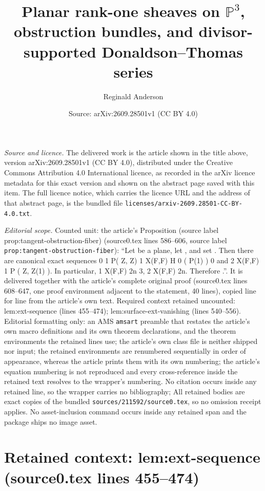 \documentclass[10pt,a4paper]{amsart}
\title[Planar rank-one sheaves on $\mathbb{P}^3$, obstruction bundles, and divisor-supported Donaldson--Thomas series]{Planar rank-one sheaves on $\mathbb{P}^3$, obstruction bundles, and divisor-supported Donaldson--Thomas series}
\author{Reginald Anderson}
\date{Source: arXiv:2609.28501v1 (CC BY 4.0)}
\theoremstyle{plain}
\theoremstyle{definition}
\theoremstyle{remark}
\begin{document}
\maketitle

\noindent\emph{Source and licence.} The delivered work is the article shown in the title above, version arXiv:2609.28501v1 (CC BY 4.0), distributed under the Creative Commons Attribution 4.0 International licence, as recorded in the arXiv licence metadata for this exact version and shown on the abstract page saved with this item. The full licence notice, which carries the licence URL and the address of that abstract page, is the bundled file \texttt{licenses/arxiv-2609.28501-CC-BY-4.0.txt}.
\par\smallskip

\noindent\textit{Editorial scope.} Counted unit: the article's Proposition (source label prop:tangent-obstruction-fiber) (source0.tex lines 586--606, source label \texttt{prop:tangent-obstruction-fiber}): ``Let be a plane, let , and set . Then there are canonical exact sequences 0 1 P( Z, Z) 1 X(F,F) H 0 ( P(1) ) 0 and 2 X(F,F) 1 P ( Z, Z(1) ). In particular, 1 X(F,F) 2n 3, 2 X(F,F) 2n. Therefore .''. It is delivered together with the article's complete original proof (source0.tex lines 608--647, one proof environment adjacent to the statement, 40 lines), copied line for line from the article's own text. Required context retained uncounted: lem:ext-sequence (lines 455--474); lem:surface-ext-vanishing (lines 540--556). Editorial formatting only: an AMS \texttt{amsart} preamble that restates the article's own macro definitions and its own theorem declarations, and the theorem environments the retained lines use; the article's own class file is neither shipped nor input; the retained environments are renumbered sequentially in order of appearance, whereas the article prints them with its own numbering; the article's equation numbering is not reproduced and every cross-reference inside the retained text resolves to the wrapper's numbering. No citation occurs inside any retained line, so the wrapper carries no bibliography; All retained bodies are exact copies of the bundled \texttt{sources/211592/source0.tex}, so no omission receipt applies. No asset-inclusion command occurs inside any retained span and the package ships no image asset.


\section*{Retained context: lem:ext-sequence (source0.tex lines 455--474)}
\end{document}
